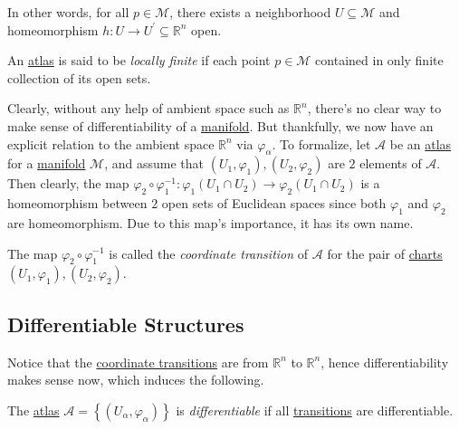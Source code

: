 In other words, for all \(p\in \mathcal{M} \), there exists a neighborhood \(U \subseteq \mathcal{M} \) and homeomorphism \(h\colon U \to U^\prime \subseteq \mathbb{R} ^n\) open.

\begin{definition}\label{def:locally-finite}
	An \hyperref[def:atlas]{atlas} is said to be \emph{locally finite} if each point \(p\in \mathcal{M} \) contained in only finite collection of its open sets.
\end{definition}

Clearly, without any help of ambient space such as \(\mathbb{R} ^n\), there's no clear way to make sense of differentiability of a \hyperref[def:topological-manifold]{manifold}. But thankfully, we now have an explicit relation to the ambient space \(\mathbb{R} ^n\) via \(\varphi _\alpha \). To formalize, let \(\mathcal{A} \) be an \hyperref[def:atlas]{atlas} for a \hyperref[def:topological-manifold]{manifold} \(\mathcal{M} \), and assume that \((U_1, \varphi _1), (U_2, \varphi _2)\) are \(2\) elements of \(\mathcal{A} \). Then clearly, the map \(\varphi _2 \circ \varphi _1 ^{-1} \colon \varphi _1(U_1 \cap U_2) \to \varphi _2(U_1 \cap U_2)\) is a homeomorphism between \(2\) open sets of Euclidean spaces since both \(\varphi _1\) and \(\varphi _2\) are homeomorphism. Due to this map's importance, it has its own name.

\begin{definition}\label{def:coordinate-transition}
	The map \(\varphi _2 \circ \varphi _1 ^{-1} \) is called the \emph{coordinate transition} of \(\mathcal{A} \) for the pair of \hyperref[def:coordinate-chart]{charts} \((U_1, \varphi _1), (U_2, \varphi _2)\).
\end{definition}

\begin{center}
\end{center}

\subsection{Differentiable Structures}
Notice that the \hyperref[def:coordinate-transition]{coordinate transitions} are from \(\mathbb{R} ^n\) to \(\mathbb{R} ^n\), hence differentiability makes sense now, which induces the following.

\begin{definition}\label{def:differentiable-atlas}
	The \hyperref[def:atlas]{atlas} \(\mathcal{A} = \left\{ (U_\alpha , \varphi _\alpha) \right\} \) is \emph{differentiable} if all \hyperref[def:coordinate-transition]{transitions} are differentiable.
\end{definition}

